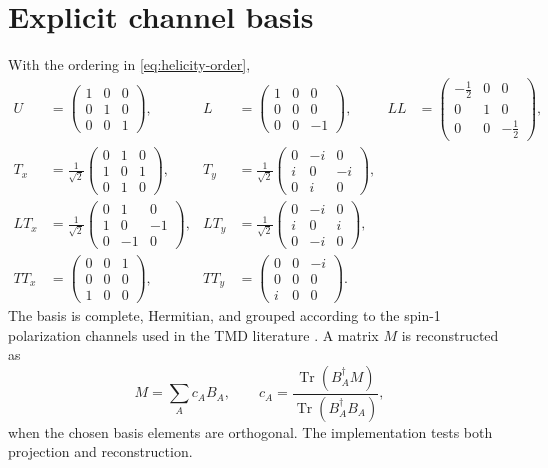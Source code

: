 \documentclass[11pt,oneside]{book}
\newcommand{\Tr}{\operatorname{Tr}}
\begin{document}
\section{Explicit channel basis}

With the ordering in \cref{eq:helicity-order},
\begin{align}
 U&=\begin{pmatrix}1&0&0\\0&1&0\\0&0&1\end{pmatrix},
 &L&=\begin{pmatrix}1&0&0\\0&0&0\\0&0&-1\end{pmatrix},
 &LL&=\begin{pmatrix}-\tfrac12&0&0\\0&1&0\\0&0&-\tfrac12\end{pmatrix},
 \label{eq:spin1-diagonal-basis}\\[0.4em]
 T_x&=\frac{1}{\sqrt2}\begin{pmatrix}0&1&0\\1&0&1\\0&1&0\end{pmatrix},
 &T_y&=\frac{1}{\sqrt2}\begin{pmatrix}0&-i&0\\i&0&-i\\0&i&0\end{pmatrix},
 \label{eq:spin1-T-basis}\\[0.4em]
 LT_x&=\frac{1}{\sqrt2}\begin{pmatrix}0&1&0\\1&0&-1\\0&-1&0\end{pmatrix},
 &LT_y&=\frac{1}{\sqrt2}\begin{pmatrix}0&-i&0\\i&0&i\\0&-i&0\end{pmatrix},
 \label{eq:spin1-LT-basis}\\[0.4em]
 TT_x&=\begin{pmatrix}0&0&1\\0&0&0\\1&0&0\end{pmatrix},
 &TT_y&=\begin{pmatrix}0&0&-i\\0&0&0\\i&0&0\end{pmatrix}.
 \label{eq:spin1-TT-basis}
\end{align}
The basis is complete, Hermitian, and grouped according to the spin-1 polarization channels used in the TMD literature \cite{BacchettaMulders2000,VanDaal2016,KumanoSong2021}.  A matrix $M$ is reconstructed as
\begin{equation}
 M=\sum_A c_A B_A,
 \qquad
 c_A=\frac{\Tr(B_A^\dagger M)}{\Tr(B_A^\dagger B_A)},
 \label{eq:spin-basis-projection}
\end{equation}
when the chosen basis elements are orthogonal.  The implementation tests both projection and reconstruction.
\end{document}
